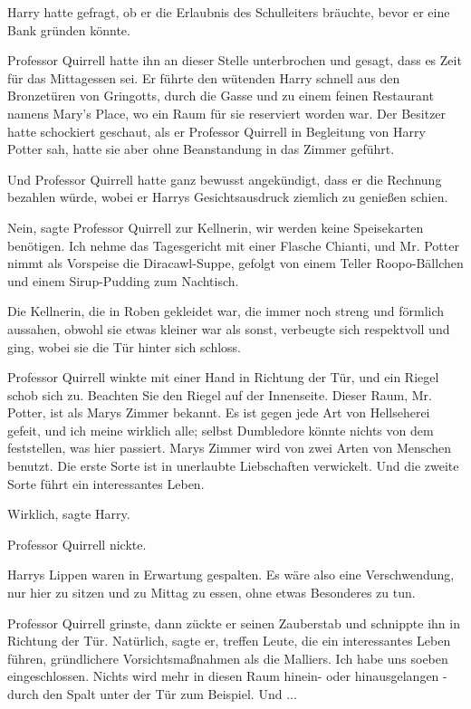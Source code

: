 Harry hatte gefragt, ob er die Erlaubnis des Schulleiters bräuchte, bevor er
eine Bank gründen könnte.

Professor Quirrell hatte ihn an dieser Stelle unterbrochen und gesagt, dass es
Zeit für das Mittagessen sei. Er führte den wütenden Harry schnell aus den
Bronzetüren von Gringotts, durch die Gasse und zu einem feinen Restaurant namens
Mary's Place, wo ein Raum für sie reserviert worden war. Der Besitzer hatte
schockiert geschaut, als er Professor Quirrell in Begleitung von Harry Potter
sah, hatte sie aber ohne Beanstandung in das Zimmer geführt.

Und Professor Quirrell hatte ganz bewusst angekündigt, dass er die Rechnung
bezahlen würde, wobei er Harrys Gesichtsausdruck ziemlich zu genießen schien.

\glqq{}Nein\grqq{}, sagte Professor Quirrell zur Kellnerin, \glqq{}wir werden
keine Speisekarten benötigen. Ich nehme das Tagesgericht mit einer Flasche
Chianti, und Mr. Potter nimmt als Vorspeise die Diracawl-Suppe, gefolgt von
einem Teller Roopo-Bällchen und einem Sirup-Pudding zum Nachtisch.\grqq{}

Die Kellnerin, die in Roben gekleidet war, die immer noch streng und förmlich
aussahen, obwohl sie etwas kleiner war als sonst, verbeugte sich respektvoll und
ging, wobei sie die Tür hinter sich schloss.

Professor Quirrell winkte mit einer Hand in Richtung der Tür, und ein Riegel
schob sich zu. \glqq{}Beachten Sie den Riegel auf der Innenseite. Dieser Raum,
Mr. Potter, ist als Marys Zimmer bekannt. Es ist gegen jede Art von Hellseherei
gefeit, und ich meine wirklich alle; selbst Dumbledore könnte nichts von dem
feststellen, was hier passiert. Marys Zimmer wird von zwei Arten von Menschen
benutzt. Die erste Sorte ist in unerlaubte Liebschaften verwickelt. Und die
zweite Sorte führt ein interessantes Leben.\grqq{}

\glqq{}Wirklich\grqq{}, sagte Harry.

Professor Quirrell nickte.

Harrys Lippen waren in Erwartung gespalten. \glqq{}Es wäre also eine
Verschwendung, nur hier zu sitzen und zu Mittag zu essen, ohne etwas Besonderes
zu tun.\grqq{}

Professor Quirrell grinste, dann zückte er seinen Zauberstab und schnippte ihn
in Richtung der Tür. \glqq{}Natürlich\grqq{}, sagte er, \glqq{}treffen Leute,
die ein interessantes Leben führen, gründlichere Vorsichtsmaßnahmen als die
Malliers. Ich habe uns soeben eingeschlossen. Nichts wird mehr in diesen Raum
hinein- oder hinausgelangen - durch den Spalt unter der Tür zum Beispiel.
Und ...\grqq{}


